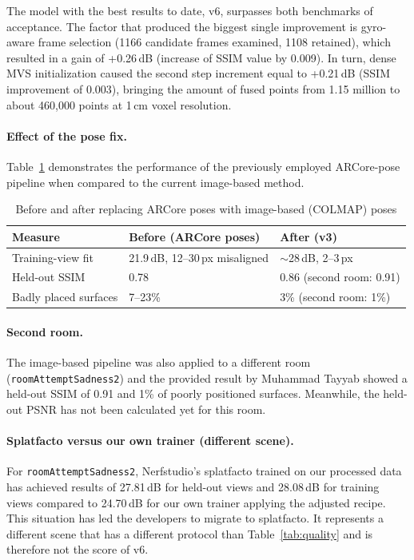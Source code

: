 The model with the best results to date, v6, surpasses both benchmarks of acceptance. The factor that produced the biggest single improvement is gyro-aware frame selection (1166 candidate frames examined, 1108 retained), which resulted in a gain of +0.26\,dB (increase of SSIM value by 0.009). In turn, dense MVS initialization caused the second step increment equal to +0.21\,dB (SSIM improvement of 0.003), bringing the amount of fused points from 1.15 million to about 460,000 points at 1\,cm voxel resolution.

\paragraph{Effect of the pose fix.} Table~\ref{tab:posefix} demonstrates the performance of the previously employed ARCore-pose pipeline when compared to the current image-based method.

\begin{table}[htbp]
\centering
\caption{Before and after replacing ARCore poses with image-based (COLMAP) poses}
\label{tab:posefix}
\begin{tabular}{p{4cm}p{4cm}p{4cm}}
\toprule
\textbf{Measure} & \textbf{Before (ARCore poses)} & \textbf{After (v3)} \\
\midrule
Training-view fit & 21.9\,dB, 12--30\,px misaligned & $\sim$28\,dB, 2--3\,px \\
Held-out SSIM & 0.78 & 0.86 (second room: 0.91) \\
Badly placed surfaces & 7--23\% & 3\% (second room: 1\%) \\
\bottomrule
\end{tabular}
\end{table}

\paragraph{Second room.} The image-based pipeline was also applied to a different room (\texttt{roomAttemptSadness2}) and the provided result by Muhammad Tayyab showed a held-out SSIM of 0.91 and 1\% of poorly positioned surfaces. Meanwhile, the held-out PSNR has not been calculated yet for this room.

\paragraph{Splatfacto versus our own trainer (different scene).} For \texttt{roomAttemptSadness2}, Nerfstudio's splatfacto trained on our processed data has achieved results of 27.81\,dB for held-out views and 28.08\,dB for training views compared to 24.70\,dB for our own trainer applying the adjusted recipe. This situation has led the developers to migrate to splatfacto. It represents a different scene that has a different protocol than Table~\ref{tab:quality} and is therefore not the score of v6.

